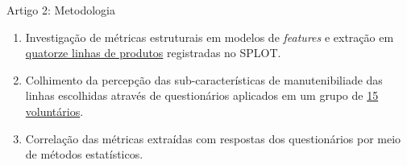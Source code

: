 
\begin{frame}[t, fragile]{Artigo 2: Metodologia}
  \begin{enumerate}      
    \item Investigação de \alert{métricas estruturais} em modelos de \textit{features} e extração em \underline{quatorze linhas de produtos} registradas no SPLOT.
    \item Colhimento da \alert{percepção das sub-características} de manutenibiliade das linhas escolhidas através de questionários aplicados em um grupo de \underline{15 voluntários}.
    \item \alert{Correlação} das métricas extraídas com respostas dos questionários por meio de \alert{métodos estatísticos}.
  \end{enumerate} 
\end{frame}